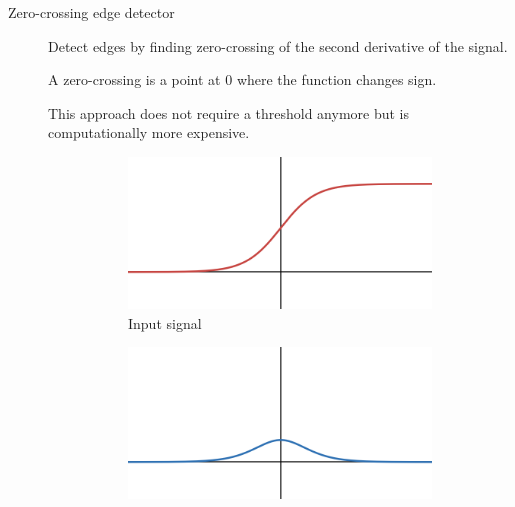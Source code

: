 \begin{description}
    \item[Zero-crossing edge detector] 
        Detect edges by finding zero-crossing of the second derivative of the signal.

        \begin{remark}
            A zero-crossing is a point at 0 where the function changes sign.
        \end{remark}

        \begin{remark}
            This approach does not require a threshold anymore but is computationally more expensive.
        \end{remark}

        \begin{figure}[H]
            \centering
            \begin{subfigure}{0.3\linewidth}
                \centering
                \includegraphics[width=\linewidth]{./img/zero_crossing_example1.png}
                \caption{Input signal}
            \end{subfigure}
            \begin{subfigure}{0.3\linewidth}
                \centering
                \includegraphics[width=\linewidth]{./img/zero_crossing_example2.png}

\end{subfigure}
\end{figure}
\end{description}
